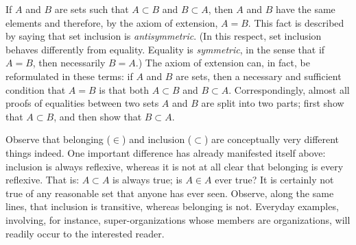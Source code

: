 If $A$ and $B$ are sets such that $A \subset B$ and
  $B \subset A$, then $A$ and $B$ have the same elements and
  therefore, by the axiom of extension, $A = B$.
This fact is described by saying that set inclusion is
  \textit{antisymmetric}.
(In this respect, set inclusion behaves differently from equality.
Equality is \textit{symmetric}, in the sense that if $A = B$,
  then necessarily $B = A$.)
The axiom of extension can, in fact, be reformulated in these
  terms: if $A$ and $B$ are sets, then a necessary and sufficient
  condition that $A = B$ is that both $A \subset B$ and
  $B \subset A$.
Correspondingly, almost all proofs of equalities between two sets
  $A$ and $B$ are split into two parts; first show that
  $A \subset B$, and then show that $B \subset A$.

Observe that belonging ($\in$) and inclusion ($\subset$) are
  conceptually very different things indeed.
One important difference has already manifested itself above:
  inclusion is always reflexive, whereas it is not at all clear
  that belonging is every reflexive.
That is: $A \subset A$ is always true; is $A \in A$ ever true?
It is certainly not true of any reasonable set that anyone has
  ever seen.
Observe, along the same lines, that inclusion is transitive,
  whereas belonging is not.
Everyday examples, involving, for instance, super-organizations
  whose members are organizations, will readily occur to the
  interested reader.
